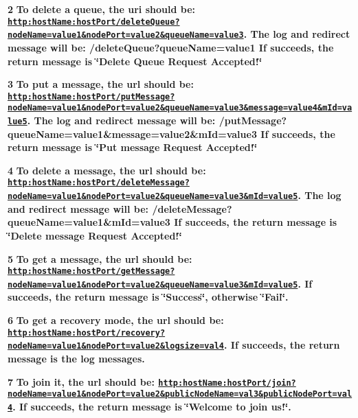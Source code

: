 {\bfseries 2} {\bfseries  \-To delete a queue, the uri should be\-: \href{http:hostName:hostPort/deleteQueue?nodeName=value1&nodePort=value2&queueName=value3}{\tt http\-:host\-Name\-:host\-Port/delete\-Queue?node\-Name=value1\&node\-Port=value2\&queue\-Name=value3}. \-The log and redirect message will be\-: /delete\-Queue?queue\-Name=value1 \-If succeeds, the return message is \char`\"{}\-Delete Queue Request Accepted!\char`\"{} }

{\bfseries 3} {\bfseries  \-To put a message, the url should be\-: \href{http:hostName:hostPort/putMessage?nodeName=value1&nodePort=value2&queueName=value3&message=value4&mId=value5}{\tt http\-:host\-Name\-:host\-Port/put\-Message?node\-Name=value1\&node\-Port=value2\&queue\-Name=value3\&message=value4\&m\-Id=value5}. \-The log and redirect message will be\-: /put\-Message?queue\-Name=value1\&message=value2\&m\-Id=value3 \-If succeeds, the return message is \char`\"{}\-Put message Request Accepted!\char`\"{} }

{\bfseries 4} {\bfseries  \-To delete a message, the url should be\-: \href{http:hostName:hostPort/deleteMessage?nodeName=value1&nodePort=value2&queueName=value3&mId=value5}{\tt http\-:host\-Name\-:host\-Port/delete\-Message?node\-Name=value1\&node\-Port=value2\&queue\-Name=value3\&m\-Id=value5}. \-The log and redirect message will be\-: /delete\-Message?queue\-Name=value1\&m\-Id=value3 \-If succeeds, the return message is \char`\"{}\-Delete message Request Accepted!\char`\"{} }

{\bfseries 5} {\bfseries  \-To get a message, the url should be\-: \href{http:hostName:hostPort/getMessage?nodeName=value1&nodePort=value2&queueName=value3&mId=value5}{\tt http\-:host\-Name\-:host\-Port/get\-Message?node\-Name=value1\&node\-Port=value2\&queue\-Name=value3\&m\-Id=value5}. \-If succeeds, the return message is \char`\"{}\-Success\char`\"{}, otherwise \char`\"{}\-Fail\char`\"{}. }

{\bfseries 6} {\bfseries  \-To get a recovery mode, the url should be\-: \href{http:hostName:hostPort/recovery?nodeName=value1&nodePort=value2&logsize=val4}{\tt http\-:host\-Name\-:host\-Port/recovery?node\-Name=value1\&node\-Port=value2\&logsize=val4}. \-If succeeds, the return message is the log messages. }

{\bfseries 7} {\bfseries  \-To join it, the url should be\-: \href{http:hostName:hostPort/join?nodeName=value1&nodePort=value2&publicNodeName=val3&publicNodePort=val4}{\tt http\-:host\-Name\-:host\-Port/join?node\-Name=value1\&node\-Port=value2\&public\-Node\-Name=val3\&public\-Node\-Port=val4}. \-If succeeds, the return message is \char`\"{}\-Welcome to join us!\char`\"{}. }


